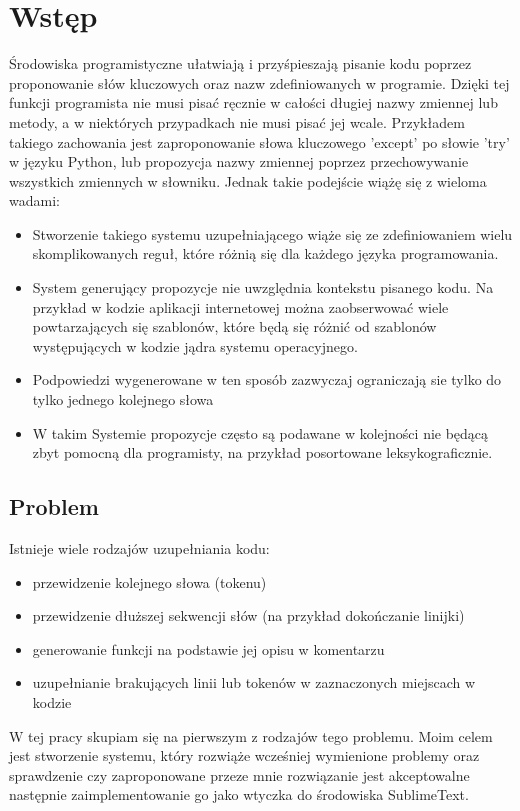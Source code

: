 \newpage %
\section{Wstęp}
\label{sec:intro}
Środowiska programistyczne ułatwiają i przyśpieszają pisanie kodu poprzez proponowanie 
słów kluczowych oraz nazw zdefiniowanych w programie. Dzięki tej funkcji programista nie musi pisać ręcznie 
w całości długiej nazwy zmiennej lub metody, a w niektórych przypadkach nie musi pisać jej wcale. 
Przykładem takiego zachowania jest zaproponowanie słowa kluczowego 'except' po słowie 'try' w języku Python,
lub propozycja nazwy zmiennej poprzez przechowywanie wszystkich zmiennych w słowniku.  
Jednak takie podejście wiążę się z wieloma wadami: 
\begin{itemize}
	\item Stworzenie takiego systemu uzupełniającego wiąże się ze zdefiniowaniem wielu skomplikowanych
	reguł, które różnią się dla każdego języka programowania. 
	\item System generujący propozycje nie uwzględnia kontekstu pisanego kodu. Na przykład w kodzie 
	aplikacji internetowej można zaobserwować wiele powtarzających się szablonów, które będą się różnić 
	od szablonów występujących w kodzie jądra systemu operacyjnego. 
	\item Podpowiedzi wygenerowane w ten sposób zazwyczaj ograniczają sie tylko do tylko jednego kolejnego słowa 
	\item W takim Systemie propozycje często są podawane w kolejności nie będącą zbyt pomocną dla programisty, 
	na przykład posortowane leksykograficznie. 
\end{itemize}

\subsection {Problem}
Istnieje wiele rodzajów uzupełniania kodu: 
\begin{itemize}
	\item przewidzenie kolejnego słowa (tokenu) 
	\item przewidzenie dłuższej sekwencji słów (na przykład dokończanie linijki)
	\item generowanie funkcji na podstawie jej opisu w komentarzu
	\item uzupełnianie brakujących linii lub tokenów w zaznaczonych miejscach w kodzie
\end{itemize}
W tej pracy skupiam się na pierwszym z rodzajów tego problemu. Moim celem jest stworzenie systemu, który rozwiąże 
wcześniej wymienione problemy oraz sprawdzenie czy zaproponowane przeze mnie rozwiązanie jest akceptowalne następnie 
zaimplementowanie go jako wtyczka do środowiska SublimeText. 


